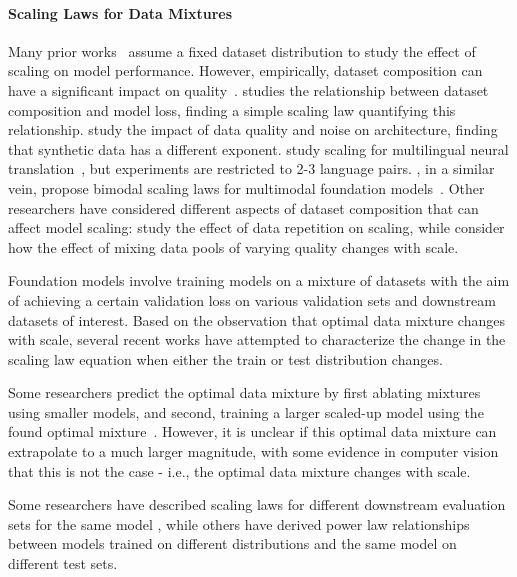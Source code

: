 \paragraph{Scaling Laws for Data Mixtures} Many prior works~\citep{hoffmann2022training} assume a fixed dataset distribution to study the effect of scaling on model performance. However, empirically, dataset composition can have a significant impact on quality~\citep{longpre2023pretrainer,albalak2024survey,sorscher2022beyond}. \citet{hashimoto2021model} studies the relationship between dataset composition and model loss, finding a simple scaling law quantifying this relationship. \citet{bansal2022data} study the impact of data quality and noise on architecture, finding that synthetic data has a different exponent. \citet{fernandes2023scaling} study scaling for multilingual neural translation~\citep{bapna-etal-2022-building}, but experiments are restricted to 2-3 language pairs. \citet{aghajanyan2023scaling}, in a similar vein, propose bimodal scaling laws for multimodal foundation models~\citep{reid2024gemini}. Other researchers have considered different aspects of dataset composition that can affect model scaling: \citet{muennighoff2024scaling} study the effect of data repetition on scaling, while \citet{goyal2024scaling} consider how the effect of mixing data pools of varying quality changes with scale. 

Foundation models involve training models on a mixture of datasets with the aim of achieving a certain validation loss on various validation sets and downstream datasets of interest. Based on the observation that optimal data mixture changes with scale, several recent works have attempted to characterize the change in the scaling law equation when either the train or test distribution changes.

Some researchers predict the optimal data mixture by first ablating mixtures using smaller models, and second, training a larger scaled-up model using the found optimal mixture~\citep{ye2024data,xie2024doremi,liu2024regmix}. However, it is unclear if this optimal data mixture can extrapolate to a much larger magnitude, with some evidence in computer vision that this is not the case \citep{goyal2024scaling} - i.e., the optimal data mixture changes with scale.

Some researchers have described scaling laws for different downstream evaluation sets for the same model \citep{dubey2024llama,chen2024scaling}, while others \citep{brandfonbrener2024loss} have derived power law relationships between models trained on different distributions and the same model on different test sets.


